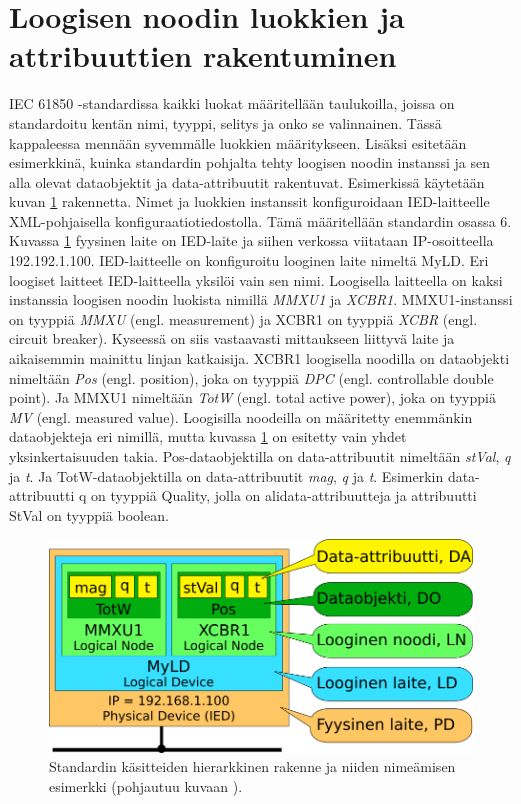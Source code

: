 \section{Loogisen noodin luokkien ja attribuuttien rakentuminen}
\label{ch:luokkien-rakentuminen-instanseista}
IEC 61850 -standardissa kaikki luokat määritellään taulukoilla, joissa on standardoitu kentän nimi, tyyppi, selitys ja onko se valinnainen. Tässä kappaleessa mennään syvemmälle luokkien määritykseen. Lisäksi esitetään esimerkkinä, kuinka standardin pohjalta tehty loogisen noodin instanssi ja sen alla olevat dataobjektit ja data-attribuutit rakentuvat. Esimerkissä käytetään kuvan \ref{fig:iec61850-data-modeling} rakennetta. Nimet ja luokkien instanssit konfiguroidaan IED-laitteelle XML-pohjaisella konfiguraatiotiedostolla. Tämä määritellään standardin osassa 6. Kuvassa \ref{fig:iec61850-data-modeling} fyysinen laite on IED-laite ja siihen verkossa viitataan IP-osoitteella 192.192.1.100. IED-laitteelle on konfiguroitu looginen laite nimeltä MyLD. Eri loogiset laitteet IED-laitteella yksilöi vain sen nimi. Loogisella laitteella on kaksi instanssia loogisen noodin luokista nimillä \emph{MMXU1} ja \emph{XCBR1}. MMXU1-instanssi on tyyppiä \emph{MMXU} (engl. measurement) \mbox{\cite[s.~57--58]{IEC61850-7-4}} ja XCBR1 on tyyppiä \emph{XCBR} (engl. circuit breaker). Kyseessä on siis vastaavasti mittaukseen liittyvä laite ja aikaisemmin mainittu linjan katkaisija. XCBR1 loogisella noodilla on dataobjekti nimeltään \emph{Pos} (engl. position), joka on tyyppiä \emph{DPC} (engl. controllable double point). Ja MMXU1 nimeltään \emph{TotW} (engl. total active power), joka on tyyppiä \emph{MV} (engl. measured value). Loogisilla noodeilla on määritetty enemmänkin dataobjekteja eri nimillä, mutta kuvassa \ref{fig:iec61850-data-modeling} on esitetty vain yhdet yksinkertaisuuden takia. Pos-dataobjektilla on data-attribuutit nimeltään \emph{stVal}, \emph{q} ja \emph{t}. Ja TotW-dataobjektilla on data-attribuutit \emph{mag}, \emph{q} ja \emph{t}. Esimerkin data-attribuutti q on tyyppiä Quality, jolla on alidata-attribuutteja ja attribuutti StVal on tyyppiä boolean. \mbox{\cite{IEC61850-7-3, IEC61850-7-4}}

\begin{figure}[ht!]
	\includegraphics[width=1\textwidth]{pictures/iec61850-data-modeling.png}
	\caption{Standardin käsitteiden hierarkkinen rakenne ja niiden nimeämisen esimerkki (pohjautuu kuvaan \mbox{\cite[s.~24]{IEC61850-1}}).}
	\label{fig:iec61850-data-modeling}
\end{figure}

